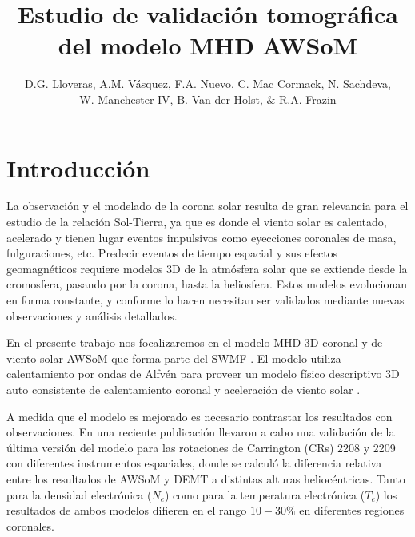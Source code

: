 \documentclass[baaa]{baaa}
\title{Estudio de validación tomográfica del modelo MHD AWSoM}
\author{D.G. Lloveras\inst{1}, A.M. Vásquez\inst{1}, F.A. Nuevo\inst{1}, C. Mac Cormack\inst{1}, N. Sachdeva\inst{2},\\ W. Manchester IV\inst{2}, B. Van der Holst\inst{2}, \& R.A. Frazin\inst{2}}
\institute{
Insituto de Astronomía y Física del Espacio, CONICET--UBA, Argentina \and
Climate and Space Sciences and Engineering, Universidad de Michigan, EEUU.
}
\begin{document}
\maketitle

\section{Introducción}
\label{S_intro}
La observación y el modelado de la corona solar resulta de gran relevancia para el estudio de la relación Sol-Tierra, ya que es donde el viento solar es calentado, acelerado y tienen lugar eventos impulsivos como eyecciones coronales de masa, fulguraciones, etc. Predecir eventos de tiempo espacial y sus efectos geomagnéticos requiere modelos 3D de la atmósfera solar que se extiende desde la cromosfera, pasando por la corona, hasta la heliosfera. Estos modelos evolucionan en forma constante, y conforme lo hacen necesitan ser validados mediante nuevas observaciones y análisis detallados.

En el presente trabajo nos focalizaremos en el modelo MHD 3D coronal y de viento solar AWSoM que forma parte del SWMF \citet{Toth_2012}. El modelo utiliza calentamiento por ondas de Alfvén para proveer un modelo físico descriptivo 3D auto consistente de calentamiento coronal y aceleración de viento solar \citep{sokolov_2013}  \citep{vander_2014}.

A medida que el modelo es mejorado es necesario contrastar los resultados con observaciones. En una reciente publicación \citet{sachdeva_2019} llevaron a cabo una validación de la última versión del modelo para las rotaciones de Carrington (CRs) 2208 y 2209 con diferentes instrumentos espaciales, donde se calculó la diferencia relativa entre los resultados de AWSoM y DEMT a distintas alturas heliocéntricas. Tanto para la densidad electrónica ($N_e$) como para la temperatura electrónica ($T_e$) los resultados de ambos modelos difieren en el rango $10-30\%$ en diferentes regiones coronales.

\end{document}
